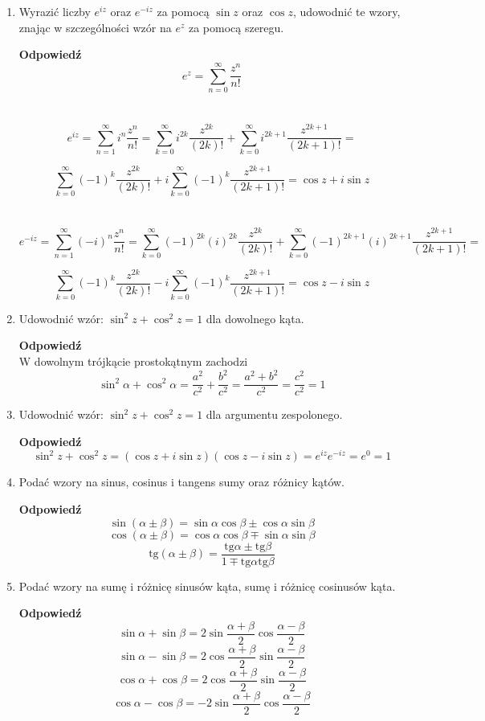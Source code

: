 \documentclass[12pt,a4paper]{article}
\theoremstyle{break}
\newcommand{\Odp}[1]{
		\begin{mdframed}[style=zadanie]
			\textbf{Odpowiedź}\\
			#1
		\end{mdframed}
	}
\newcommand{\tg}{\text{tg}}
\begin{document}
\begin{enumerate}[1.]
	\item Wyrazić liczby $e^{iz}$ oraz $e^{-iz}$ za pomocą $\sin z$ oraz $\cos z$, udowodnić te wzory, znając w	szczególności wzór na $e^z$ za pomocą szeregu.
	\Odp{
		$$e^z=\sum_{n=0}^{\infty} \frac{z^n}{n!}$$\\\\
		
		$$e^{iz}=\sum_{n=1}^{\infty} i^n\frac{z^n}{n!}=
		\sum_{k=0}^{\infty}i^{2k}\frac{z^{2k}}{(2k)!}+\sum_{k=0}^{\infty}i^{2k+1}\frac{z^{2k+1}}{(2k+1)!}=$$
		
		 $$
		\sum_{k=0}^{\infty}(-1)^{k}\frac{z^{2k}}{(2k)!}+i\sum_{k=0}^{\infty}(-1)^{k}\frac{z^{2k+1}}{(2k+1)!}=\cos z + i\sin z$$\\\\
		
		$$e^{-iz}=\sum_{n=1}^{\infty} (-i)^n\frac{z^n}{n!}=
		\sum_{k=0}^{\infty}(-1)^{2k}(i)^{2k}\frac{z^{2k}}{(2k)!}+\sum_{k=0}^{\infty}(-1)^{2k+1}(i)^{2k+1}\frac{z^{2k+1}}{(2k+1)!}=$$
		
		$$\sum_{k=0}^{\infty}(-1)^{k}\frac{z^{2k}}{(2k)!}-i\sum_{k=0}^{\infty}(-1)^{k}\frac{z^{2k+1}}{(2k+1)!}=\cos z - i\sin z$$
		
	}
	
	\item Udowodnić wzór: $\sin^2 z + \cos^2 z = 1$ dla dowolnego kąta.
	\Odp{
		W dowolnym trójkącie prostokątnym zachodzi
		$$\sin^2\alpha+\cos^2\alpha=\frac{a^2}{c^2}+\frac{b^2}{c^2}=\frac{a^2+b^2}{c^2}=\frac{c^2}{c^2}=1$$	
	}
	
	\item Udowodnić wzór: $\sin^2 z + \cos^2 z = 1$ dla argumentu zespolonego.
	\Odp{
		$$\sin^2z+\cos^2z = (\cos z+i\sin z)(\cos z-i\sin z)=e^{iz}e^{-iz}=e^0=1$$
	}
	
	\item Podać wzory na sinus, cosinus i tangens sumy oraz różnicy kątów.
	\Odp{
		$$\sin(\alpha\pm\beta)=\sin\alpha\cos\beta\pm\cos\alpha\sin\beta$$
		$$\cos(\alpha\pm\beta)=\cos\alpha\cos\beta\mp\sin\alpha\sin\beta$$
		$$\tg(\alpha\pm\beta)=\frac{\tg\alpha\pm\tg\beta}{1\mp\tg\alpha\tg\beta}$$
	}
	
	\item Podać wzory na sumę i różnicę sinusów kąta, sumę i różnicę cosinusów kąta.
	\Odp{
		$$\sin\alpha+\sin\beta=2\sin\frac{\alpha+\beta}{2}\cos\frac{\alpha-\beta}{2}$$
		$$\sin\alpha-\sin\beta=2\cos\frac{\alpha+\beta}{2}\sin\frac{\alpha-\beta}{2}$$
		$$\cos\alpha+\cos\beta=2\cos\frac{\alpha+\beta}{2}\sin\frac{\alpha-\beta}{2}$$
		$$\cos\alpha-\cos\beta=-2\sin\frac{\alpha+\beta}{2}\cos\frac{\alpha-\beta}{2}$$
	}
	

\end{enumerate}
\end{document}
